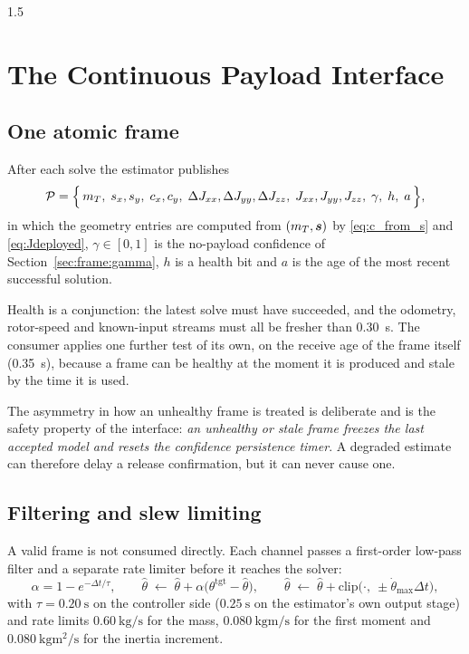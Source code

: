 \begin{spacing}{1.5}
\section{The Continuous Payload Interface}\label{sec:frame:interface}

\subsection{One atomic frame}\label{sec:frame:frame}

After each solve the estimator publishes
\begin{equation}
\mathcal{P} = \Bigl\{\, m_T,\; s_x, s_y,\; c_x, c_y,\;
\Delta J_{xx},\Delta J_{yy},\Delta J_{zz},\; J_{xx},J_{yy},J_{zz},\; \gamma,\; h,\; a \,\Bigr\},
\label{eq:frame}
\end{equation}
in which the geometry entries are computed from $(m_T,\bm{s})$ by
\eqref{eq:c_from_s} and \eqref{eq:Jdeployed}, $\gamma\in[0,1]$ is the no-payload
confidence of Section~\ref{sec:frame:gamma}, $h$ is a health bit and $a$ is the
age of the most recent successful solution.

Health is a conjunction: the latest solve must have succeeded, and the odometry,
rotor-speed and known-input streams must all be fresher than
\SI{0.30}{\second}. The consumer applies one further test of its own, on the
receive age of the frame itself (\SI{0.35}{\second}), because a frame can be
healthy at the moment it is produced and stale by the time it is used.

The asymmetry in how an unhealthy frame is treated is deliberate and is the
safety property of the interface: \emph{an unhealthy or stale frame freezes the
last accepted model and resets the confidence persistence timer}. A degraded
estimate can therefore delay a release confirmation, but it can never cause one.

\subsection{Filtering and slew limiting}\label{sec:frame:filter}

A valid frame is not consumed directly. Each channel passes a first-order
low-pass filter and a separate rate limiter before it reaches the solver:
\begin{equation}
\alpha = 1 - e^{-\Delta t/\tau},
\qquad
\hat\theta \;\leftarrow\; \hat\theta + \alpha\bigl(\theta^{\mathrm{tgt}} - \hat\theta\bigr),
\qquad
\hat\theta \;\leftarrow\; \hat\theta + \mathrm{clip}\bigl(\cdot,\ \pm \dot\theta_{\max}\Delta t\bigr),
\label{eq:lpfslew}
\end{equation}
with $\tau=\SI{0.20}{\second}$ on the controller side
($\SI{0.25}{\second}$ on the estimator's own output stage) and rate limits
$\SI{0.60}{\kg\per\second}$ for the mass, $\SI{0.080}{\kg\meter\per\second}$ for
the first moment and $\SI{0.080}{\kg\meter\squared\per\second}$ for the inertia
increment.


\end{spacing}
